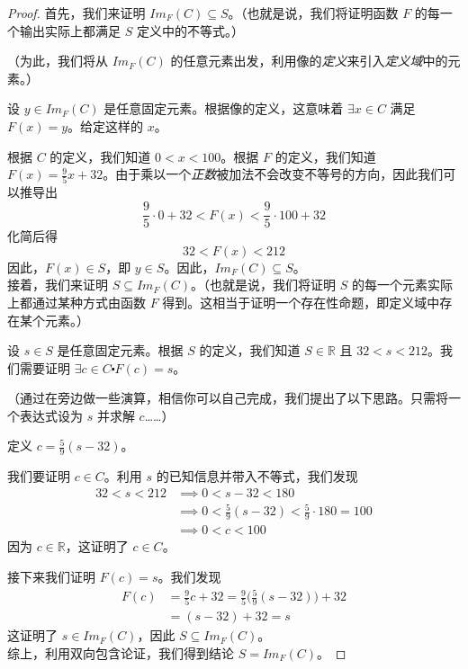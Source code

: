 \begin{example}
    \begin{proof}
        首先，我们来证明 $Im_F (C) \subseteq S$。（也就是说，我们将证明函数 $F$ 的每一个输出实际上都满足 $S$ 定义中的不等式。）

        （为此，我们将从 $Im_F (C)$ 的任意元素出发，利用像的\emph{定义}来引入\emph{定义域}中的元素。）

        设 $y \in Im_F (C)$ 是任意固定元素。根据像的定义，这意味着 $\exists x \in C$ 满足 $F(x) = y$。给定这样的 $x$。

        根据 $C$ 的定义，我们知道 $ 0 < x < 100$。根据 $F$ 的定义，我们知道 $F(x) = \frac{9}{5}x + 32$。由于乘以一个\emph{正数}被加法不会改变不等号的方向，因此我们可以推导出
        \[ \frac{9}{5} \cdot 0 + 32 < F(x) <  \frac{9}{5} \cdot 100 + 32\]
        化简后得
        \[32 < F(x) < 212\]
        因此，$F(x) \in S$，即 $y \in S$。因此，$Im_F (C) \subseteq S$。\\
        
        接着，我们来证明 $S \subseteq Im_F (C)$。（也就是说，我们将证明 $S$ 的每一个元素实际上都通过某种方式由函数 $F$ 得到。这相当于证明一个存在性命题，即定义域中存在某个元素。）

        设 $s \in S$ 是任意固定元素。根据 $S$ 的定义，我们知道 $S \in \mathbb{R}$ 且 $32 < s < 212$。我们需要证明 $\exists c \in C \centerdot F(c) = s$。

        （通过在旁边做一些演算，相信你可以自己完成，我们提出了以下思路。只需将一个表达式设为 $s$ 并求解 $c$……）

        定义 $c = \frac{5}{9}(s-32)$。

        我们要证明 $c \in C$。利用 $s$ 的已知信息并带入不等式，我们发现
        \begin{align*}
            32 < s < 212 &\implies 0 < s - 32 < 180 \\
            &\implies 0 < \frac{5}{9}(s - 32) < \frac{5}{9} \cdot 180 = 100 \\
            &\implies 0 < c < 100
        \end{align*}
        因为 $c \in \mathbb{R}$，这证明了 $c \in C$。

        接下来我们证明 $F(c) = s$。我们发现
        \begin{align*}
            F(c) &= \frac{9}{5}c + 32 = \frac{9}{5}\Big(\frac{5}{9}(s-32)\Big)+32\\
            &= (s - 32) + 32 = s
        \end{align*}
        这证明了 $s \in Im_F (C)$，因此 $S \subseteq Im_F (C)$。\\

        综上，利用双向包含论证，我们得到结论 $S = Im_F (C)$。
    \end{proof}
\end{example}

